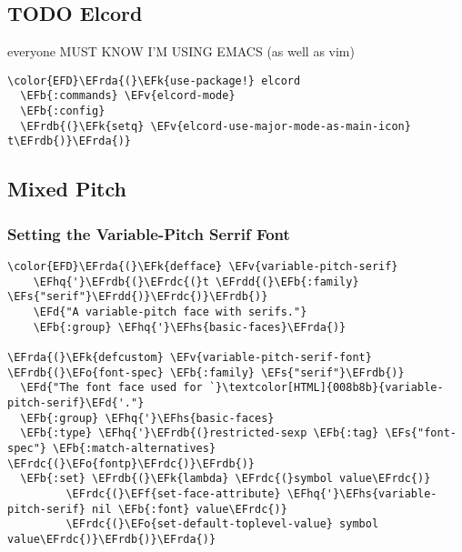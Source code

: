 \documentclass{article}
\newcommand{\EFs}[1]{\textcolor{EFs}{#1}} %
\newcommand{\EFd}[1]{\textcolor{EFd}{#1}} %
\newcommand{\EFk}[1]{\textcolor{EFk}{#1}} %
\newcommand{\EFb}[1]{\textcolor{EFb}{#1}} %
\newcommand{\EFf}[1]{\textcolor{EFf}{#1}} %
\newcommand{\EFv}[1]{\textcolor{EFv}{#1}} %
\newcommand{\EFo}[1]{\textcolor{EFo}{#1}} %
\newcommand{\EFhq}[1]{#1} %
\newcommand{\EFhs}[1]{\textcolor{EFhs}{#1}} %
\newcommand{\EFrda}[1]{\textcolor{EFrda}{#1}} %
\newcommand{\EFrdb}[1]{\textcolor{EFrdb}{#1}} %
\newcommand{\EFrdc}[1]{\textcolor{EFrdc}{#1}} %
\newcommand{\EFrdd}[1]{\textcolor{EFrdd}{#1}} %
\begin{document}
\subsection{{\bfseries\sffamily TODO} Elcord}
\label{sec:orgb99ae82}
everyone MUST KNOW I'M USING EMACS (as well as vim)
\begin{Code}
\begin{Verbatim}
\color{EFD}\EFrda{(}\EFk{use-package!} elcord
  \EFb{:commands} \EFv{elcord-mode}
  \EFb{:config}
  \EFrdb{(}\EFk{setq} \EFv{elcord-use-major-mode-as-main-icon} t\EFrdb{)}\EFrda{)}
\end{Verbatim}
\end{Code}

\subsection{Mixed Pitch}
\label{sec:org1b0dd3e}
\subsubsection{Setting the Variable-Pitch Serrif Font}
\label{sec:orga8bbaca}
\begin{Code}
\begin{Verbatim}
\color{EFD}\EFrda{(}\EFk{defface} \EFv{variable-pitch-serif}
    \EFhq{'}\EFrdb{(}\EFrdc{(}t \EFrdd{(}\EFb{:family} \EFs{"serif"}\EFrdd{)}\EFrdc{)}\EFrdb{)}
    \EFd{"A variable-pitch face with serifs."}
    \EFb{:group} \EFhq{'}\EFhs{basic-faces}\EFrda{)}

\EFrda{(}\EFk{defcustom} \EFv{variable-pitch-serif-font} \EFrdb{(}\EFo{font-spec} \EFb{:family} \EFs{"serif"}\EFrdb{)}
  \EFd{"The font face used for `}\textcolor[HTML]{008b8b}{variable-pitch-serif}\EFd{'."}
  \EFb{:group} \EFhq{'}\EFhs{basic-faces}
  \EFb{:type} \EFhq{'}\EFrdb{(}restricted-sexp \EFb{:tag} \EFs{"font-spec"} \EFb{:match-alternatives} \EFrdc{(}\EFo{fontp}\EFrdc{)}\EFrdb{)}
  \EFb{:set} \EFrdb{(}\EFk{lambda} \EFrdc{(}symbol value\EFrdc{)}
         \EFrdc{(}\EFf{set-face-attribute} \EFhq{'}\EFhs{variable-pitch-serif} nil \EFb{:font} value\EFrdc{)}
         \EFrdc{(}\EFo{set-default-toplevel-value} symbol value\EFrdc{)}\EFrdb{)}\EFrda{)}

\end{Verbatim}
\end{Code}
\end{document}
